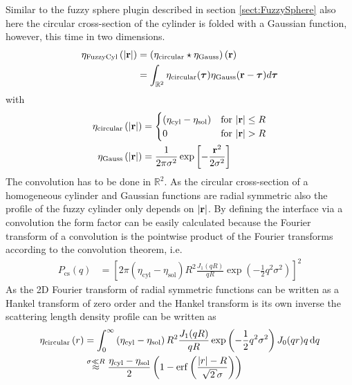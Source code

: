 Similar to the fuzzy sphere plugin described in section \ref{sect:FuzzySphere} also here the circular cross-section of the cylinder is folded with a Gaussian function, however, this time in two dimensions.
\begin{align}
\eta_\text{FuzzyCyl}\left({\left\vert\mathbf{r}\right\vert}\right)
        &= \left(\eta_\text{circular}\star\eta_\text{Gauss}\right)(\mathbf{r}) \nonumber \\
        &= \int_{\mathbb{R}^2}\eta_\text{circular}(\boldsymbol{\tau}) \eta_\text{Gauss}(\mathbf{r}-\boldsymbol{\tau}) d\boldsymbol{\tau}
\end{align}
with
\begin{subequations}
\begin{align}
\eta_\text{circular}\left({\left\vert\mathbf{r}\right\vert}\right) &=
\begin{cases}
\left(\eta_\text{cyl}-\eta_\text{sol}\right) & \mbox{for~} {\left\vert\mathbf{r}\right\vert}\leq R \\
0 & \mbox{for~} {\left\vert\mathbf{r}\right\vert}>R
\end{cases} \\
\eta_\text{Gauss}\left({\left\vert\mathbf{r}\right\vert}\right) &= \frac{1}{2 \pi
\sigma^2} \exp\left[ -\frac{\mathbf{r}^2}{2\sigma^2}\right]
\end{align}
\end{subequations}
The convolution has to be done in $\mathbb{R}^2$. As the circular
cross-section of a homogeneous cylinder and Gaussian functions are radial symmetric also the
profile of the fuzzy cylinder only depends on ${\left\vert\mathbf{r}\right\vert}$. By
defining the interface via a convolution the form factor can be
easily calculated because the Fourier transform of a convolution
is the pointwise product of the Fourier transforms according to
the convolution theorem, i.e.
\begin{align}\label{eq:Pcs:cyl_fuzzy}
  P_\mathrm{cs}(q) &= \left[2\pi \left(\eta_\text{cyl}-\eta_\text{sol}\right) R^2\frac{J_1(qR)}{qR} \exp\left(-\frac12 q^2\sigma^2\right)\right]^2
\end{align}
As the 2D Fourier transform of radial symmetric functions can be written as a Hankel transform of zero order \cite{Kohlbrecher2017}
and the Hankel transform is its own inverse the scattering length density profile can be written as
\begin{align}
\eta_\text{circular}\left(r\right) &= \int_0^\infty \left(\eta_\text{cyl}-\eta_\text{sol}\right) R^2\frac{J_1(qR)}{qR} \exp\left(-\frac12 q^2\sigma^2\right) J_0(qr) q \, \mathrm{d}q \\
&\overset{\sigma \ll R}{\approx}
  \frac{\eta_\text{cyl}-\eta_\text{sol}}{2}\left(1-\mathrm{erf}\left(\frac{\abs{r}-R}{\sqrt{2}\sigma}\right)\right)
\end{align}

